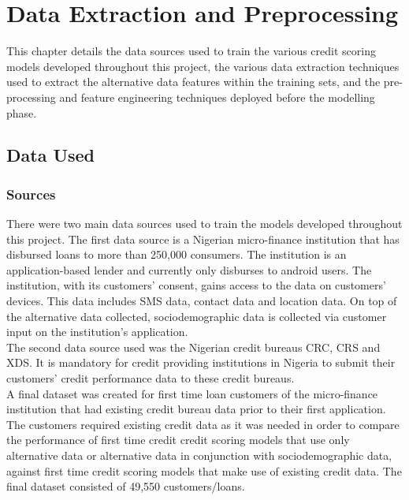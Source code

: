 \chapter{Data Extraction and Preprocessing} 
\label{Chapter3}

This chapter details the data sources used to train the various credit scoring models developed throughout this project, the various data extraction techniques used to extract the alternative data features within the training sets, and the pre-processing and feature engineering techniques deployed before the modelling phase.   

\section{Data Used}

\subsection{Sources}

There were two main data sources used to train the models developed throughout this project. The first data source is a Nigerian micro-finance institution that has disbursed loans to more than 250,000 consumers. The institution is an application-based lender and currently only disburses to android users. The institution, with its customers' consent, gains access to the data on customers' devices. This data includes SMS data, contact data and location data. On top of the alternative data collected, sociodemographic data is collected via customer input on the institution's application. \\

The second data source used was the Nigerian credit bureaus CRC, CRS and XDS. It is mandatory for credit providing institutions in Nigeria to submit their customers' credit performance data to these credit bureaus. \\

A final dataset was created for first time loan customers of the micro-finance institution that had existing credit bureau data prior to their first application. The customers required existing credit data as it was needed in order to compare the performance of first time credit credit scoring models that use only alternative data or alternative data in conjunction with sociodemographic data, against first time credit scoring models that make use of existing credit data. The final dataset consisted of 49,550 customers/loans. 

